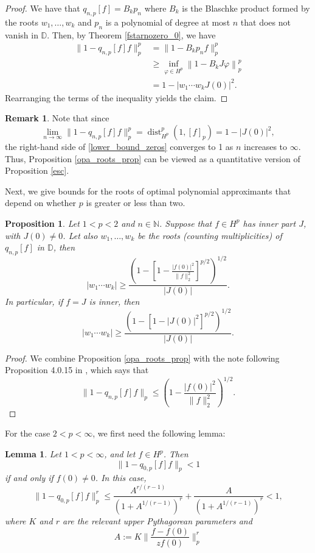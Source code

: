 \documentclass{article}
\theoremstyle{plain}
\numberwithin{Theorem}{section}
\numberwithin{equation}{section}
\theoremstyle{plain}
\newtheorem{Proposition}[Theorem]{Proposition}
\newtheorem{Lemma}[Theorem]{Lemma}
\theoremstyle{definition}
\newtheorem{Remark}[Theorem]{Remark}
\renewcommand{\leq}{\leqslant}
\renewcommand{\geq}{\geqslant}
\newcommand{\D}{\mathbb{D}}
\begin{document}
\begin{proof}
We have that $q_{n,p}[f]=B_kp_n$ where $B_k$ is the Blaschke product formed by the roots $w_1,\dots,w_k$ and $p_n$ is a polynomial of degree at most $n$ that does not vanish in $\D$. Then, by Theorem \ref{fstarnozero_0}, we have
\begin{align*}
    \|1 - q_{n,p}[f]f\|_p^p
    &= \|1 - B_kp_nf\|_p^p \\
    &\geq\inf_{\varphi \in H^p} \left\| 1 - B_k J\varphi \right\|_p^p\\
    &= 1 - |w_1\cdots w_k J(0)|^2.
\end{align*}
Rearranging the terms of the inequality yields the claim.
\end{proof}
\begin{Remark}
    Note that since 
    \begin{equation*}
       \lim_{n \rightarrow \infty} \|1 - q_{n,p}[f]f\|_p^p = \operatorname{dist}_{H^p}^p(1, [f]_p) = 1 - |J(0)|^2,        
    \end{equation*}
   the right-hand side of \eqref{lower_bound_zeros} converges to 1 as $n$ increases to $\infty$. Thus, Proposition \ref{opa_roots_prop} can be viewed as a quantitative version of Proposition \ref{esc}.
\end{Remark}
Next, we give bounds for the roots of optimal polynomial approximants that depend on whether $p$ is greater or less than two.

\begin{Proposition}
Let $1 < p < 2$ and $n\in\mathbb{N}$. Suppose that $f \in H^p$ has inner part $J$, with $J(0) \neq 0$. Let also $w_1,\dots,w_k$ be the roots (counting multiplicities) of $q_{n,p}[f]$ in $\mathbb{D}$, then
\[
|w_1\cdots w_k| \geq \frac{\left(1 - \left[1 - \frac{|f(0)|^2}{\|f\|_2^2}\right]^{p/2} \right)^{1/2}}{|J(0)|}.
\]
In particular, if $f = J$ is inner, then
\[
|w_1\cdots w_k| \geq \frac{\left(1 - \left[1 - |J(0)|^2 \right]^{p/2} \right)^{1/2}}{|J(0)|}.
\]
\end{Proposition}

\begin{proof}
We combine Proposition \ref{opa_roots_prop} with the note following Proposition 4.0.15 in \cite{ChengFelder}, which says that
\[
\|1 - q_{n,p}[f]f\|_p \leq \left(1 - \frac{|f(0)|^2}{\|f\|_2^2} \right)^{1/2}.
\]
\end{proof}
For the case $2 < p < \infty$, we first need the following lemma: 
\begin{Lemma}\label{0_opa}
    Let $1<p<\infty$, and let $f \in H^p$.  Then
    \[
           \|1-q_{0,p}[f]f\|_p < 1
    \]
    if and only if $f(0) \neq 0$. In this case,
    \[
    \|1-q_{0,p}[f]f\|_p^r  \leq \frac{A^{r/(r-1)}}{(1 + A^{1/(r-1)})^r} + \frac{A}{(1 + A^{1/(r-1)})^r} < 1,
     \]
     where $K$ and $r$ are the relevant upper Pythagorean parameters and
     \[
         A:= K\bigg\| \frac{f-f(0)}{zf(0)}  \bigg\|^r_p
     \]
\end{Lemma}
\end{document}
